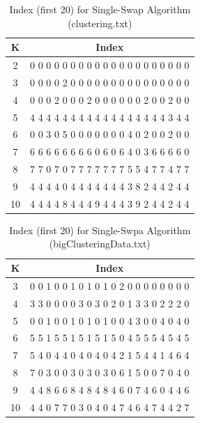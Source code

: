 \begin{description}
\begin{description}
\begin{table}[H]
	\centering
	\caption{Index (first 20) for Single-Swap Algorithm (clustering.txt)}
	\label{table:index_single_clustering}	
	\begin{tabular}{ c | c }
		\hline \hline
		K        &    Index  \\[0.1cm]
		\hline
		2   & 0 0 0 0 0 0 0 0 0 0 0 0 0 0 0 0 0 0 0 0 \\[0.1cm]
	    3   & 0 0 0 0 2 0 0 0 0 0 0 0 0 0 0 0 0 0 0 0 \\[0.1cm]
        4   & 0 0 0 2 0 0 0 2 0 0 0 0 0 0 2 0 0 2 0 0 \\[0.1cm]
        5   & 4 4 4 4 4 4 4 4 4 4 4 4 4 4 4 4 4 3 4 4 \\[0.1cm]
        6   & 0 0 3 0 5 0 0 0 0 0 0 0 4 0 2 0 0 2 0 0 \\[0.1cm]
        7   & 6 6 6 6 6 6 6 6 0 6 0 6 4 0 3 6 6 6 6 0 \\[0.1cm]
        8   & 7 7 0 7 0 7 7 7 7 7 7 7 5 5 4 7 7 4 7 7 \\[0.1cm]
        9   & 4 4 4 4 0 4 4 4 4 4 4 4 3 8 2 4 4 2 4 4 \\[0.1cm]
        10 & 4 4 4 4 8 4 4 4 9 4 4 4 3 9 2 4 4 2 4 4 \\[0.1cm]
		\hline	
	\end{tabular}
\end{table}

\begin{table}[H]
	\centering
	\caption{Index (first 20) for Single-Swpa Algorithm (bigClusteringData.txt)}
	\label{table:index_single_bigClustering}	
	\begin{tabular}{ c | c }
		\hline \hline
		K    & Index \\[0.1cm]
		\hline
		3     &  0 0 1 0 0 1 0 1 0 1 0 2 0 0 0 0 0 0 0 0 \\[0.1cm]
		4     &  3 3 0 0 0 0 3 0 3 0 2 0 1 3 3 0 2 2 2 0 \\[0.1cm]
		5     &  0 0 1 0 0 1 0 1 0 1 0 0 4 3 0 0 4 0 4 0 \\[0.1cm]
		6     &  5 5 1 5 5 1 5 1 5 1 5 0 4 5 5 5 4 5 4 5 \\[0.1cm]
		7     &  5 4 0 4 4 0 4 0 4 0 4 2 1 5 4 4 1 4 6 4 \\[0.1cm]
		8     &  7 0 3 0 0 3 0 3 0 3 0 6 1 5 0 0 7 0 4 0 \\[0.1cm]
		9     &  4 4 8 6 6 8 4 8 4 8 4 6 0 7 4 6 0 4 4 6 \\[0.1cm]
		10   &  4 4 0 7 7 0 3 0 4 0 4 7 4 6 4 7 4 4 2 7 \\[0.1cm]
		\hline	
	\end{tabular}
\end{table}


\end{description}
\end{description}
